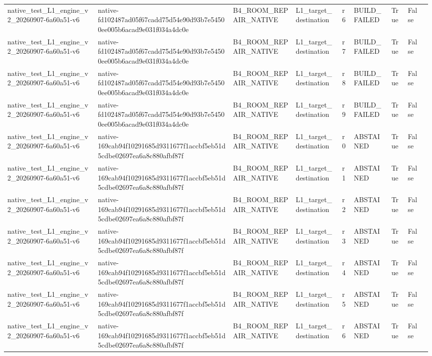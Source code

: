 \begin{tabular}{lllllllll}
native\_test\_L1\_engine\_v2\_20260907-6a60a51-v6 & native-fd102487ad05f67cadd75d54e90d93b7e54500ee005b6acad9e031f034a4dc0e & B4\_ROOM\_REPAIR\_NATIVE & L1\_target\_destination & r6 & BUILD\_FAILED & True & False &  \\
native\_test\_L1\_engine\_v2\_20260907-6a60a51-v6 & native-fd102487ad05f67cadd75d54e90d93b7e54500ee005b6acad9e031f034a4dc0e & B4\_ROOM\_REPAIR\_NATIVE & L1\_target\_destination & r7 & BUILD\_FAILED & True & False &  \\
native\_test\_L1\_engine\_v2\_20260907-6a60a51-v6 & native-fd102487ad05f67cadd75d54e90d93b7e54500ee005b6acad9e031f034a4dc0e & B4\_ROOM\_REPAIR\_NATIVE & L1\_target\_destination & r8 & BUILD\_FAILED & True & False &  \\
native\_test\_L1\_engine\_v2\_20260907-6a60a51-v6 & native-fd102487ad05f67cadd75d54e90d93b7e54500ee005b6acad9e031f034a4dc0e & B4\_ROOM\_REPAIR\_NATIVE & L1\_target\_destination & r9 & BUILD\_FAILED & True & False &  \\
native\_test\_L1\_engine\_v2\_20260907-6a60a51-v6 & native-169cab94f10291685d9311677f1accbf5eb51d5cdbe02697ea6a8c880afbf87f & B4\_ROOM\_REPAIR\_NATIVE & L1\_target\_destination & r0 & ABSTAINED & True & False &  \\
native\_test\_L1\_engine\_v2\_20260907-6a60a51-v6 & native-169cab94f10291685d9311677f1accbf5eb51d5cdbe02697ea6a8c880afbf87f & B4\_ROOM\_REPAIR\_NATIVE & L1\_target\_destination & r1 & ABSTAINED & True & False &  \\
native\_test\_L1\_engine\_v2\_20260907-6a60a51-v6 & native-169cab94f10291685d9311677f1accbf5eb51d5cdbe02697ea6a8c880afbf87f & B4\_ROOM\_REPAIR\_NATIVE & L1\_target\_destination & r2 & ABSTAINED & True & False &  \\
native\_test\_L1\_engine\_v2\_20260907-6a60a51-v6 & native-169cab94f10291685d9311677f1accbf5eb51d5cdbe02697ea6a8c880afbf87f & B4\_ROOM\_REPAIR\_NATIVE & L1\_target\_destination & r3 & ABSTAINED & True & False &  \\
native\_test\_L1\_engine\_v2\_20260907-6a60a51-v6 & native-169cab94f10291685d9311677f1accbf5eb51d5cdbe02697ea6a8c880afbf87f & B4\_ROOM\_REPAIR\_NATIVE & L1\_target\_destination & r4 & ABSTAINED & True & False &  \\
native\_test\_L1\_engine\_v2\_20260907-6a60a51-v6 & native-169cab94f10291685d9311677f1accbf5eb51d5cdbe02697ea6a8c880afbf87f & B4\_ROOM\_REPAIR\_NATIVE & L1\_target\_destination & r5 & ABSTAINED & True & False &  \\
native\_test\_L1\_engine\_v2\_20260907-6a60a51-v6 & native-169cab94f10291685d9311677f1accbf5eb51d5cdbe02697ea6a8c880afbf87f & B4\_ROOM\_REPAIR\_NATIVE & L1\_target\_destination & r6 & ABSTAINED & True & False &  \\

\end{tabular}
